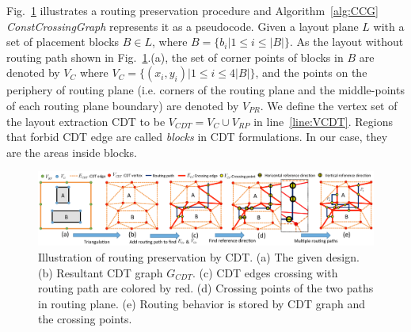       Fig.~\ref{fig:CGC} illustrates a routing preservation procedure and Algorithm~\ref{alg:CCG} {\it ConstCrossingGraph} represents it as a pseudocode. Given a layout plane $L$ with a set of placement blocks $B \in L$, where $B = \{b_i|1 \leq i \leq |B|\}$. As the layout without routing path shown in Fig.~\ref{fig:CGC}.(a), the set of corner points of blocks in $B$ are denoted by $V_C$ where $V_C = \{(x_i,y_i)|1 \leq i \leq 4|B|\}$, and the points on the periphery of routing plane (i.e. corners of the routing plane and the middle-points of each routing plane boundary) are denoted by $V_{PR}$. We define the vertex set of the layout extraction CDT to be $V_{CDT} = V_C \cup V_{RP}$ in line~\ref{line:VCDT}. Regions that forbid CDT edge are called {\it blocks} in CDT formulations. In our case, they are the areas inside blocks.

      \begin{figure}[t]
        \begin{center}
        \includegraphics[width=\textwidth]{Fig/Chapter4/CGC.eps}
        \caption{Illustration of routing preservation by CDT. 
          (a) The given design.
          (b) Resultant CDT graph $G_{CDT}$.
          (c) CDT edges crossing with routing path are colored by red.
          (d) Crossing points of the two paths in routing plane.
          (e) Routing behavior is stored by CDT graph and the crossing points.}
        \label{fig:CGC}
        \end{center}
      \end{figure}

